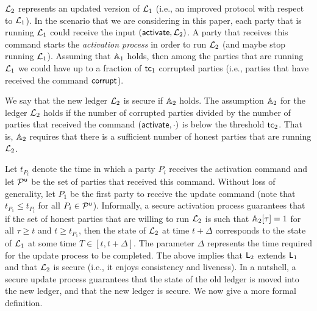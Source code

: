  


$\mathcal{L}_2$ represents an updated version of $\mathcal{L}_1$ (i.e., an improved protocol with respect to $\mathcal{L}_1$).
In the scenario that we are considering in this paper, each party that is running $\mathcal{L}_1$ could receive the input $(\mathsf{activate}, \mathcal{L}_2)$. A party
that receives this command starts the \emph{activation process}
in order to run $\mathcal{L}_2$ (and maybe stop running $\mathcal{L}_1$).
Assuming that $\mathbb{A}_1$ holds, then among the parties that are running $\mathcal{L}_1$ we could have up to a fraction of $\mathsf{tc}_1$ corrupted parties (i.e., parties that have received the command $\mathsf{corrupt}$).

We say that the new ledger $\mathcal{L}_2$ is secure if $\mathbb{A}_2$ holds. The assumption $\mathbb{A}_2$ for the ledger $\mathcal{L}_2$ holds if the number of corrupted parties
divided by the number of parties that received the command $(\mathsf{activate}, \cdot)$ is below the threshold $\mathsf{tc}_2$.
That is, $\mathbb{A}_2$ requires that there is a sufficient number of honest parties that are running $\mathcal{L}_2$.


Let $t_{P_i}$ denote the time in which
a party $P_i$ receives the activation command and let $\mathcal{P}^\mathsf{u}$ be the set of parties that received this command. Without loss of generality, let $P_1$ be the first party to receive the update command (note that $t_{P_1}\leq t_{P_i}$ for all $P_i\in\mathcal{P}^\mathsf{u}$).
Informally, a secure activation process guarantees that if the set of honest parties that are willing to run $\mathcal{L}_2$
is such that $\mathbb{A}_2[\tau]=1$ for all $\tau\geq t$ and  $t\geq t_{P_1}$, then
the state of $\mathcal{L}_2$ at time $t+\Delta$ corresponds to the state of $\mathcal{L}_1$ at some time
$T\in [t,t+\Delta]$.
The parameter $\Delta$ represents the time required for the update process to be completed.
The above implies that $\mathsf{L}_2$  extends $\mathsf{L}_1$ and that $\mathcal{L}_2$ is secure (i.e., it enjoys consistency and liveness).
In a nutshell, a secure update process guarantees that the state of the old ledger is moved into the new ledger, and that the new ledger is secure.
We now give a more formal definition.

